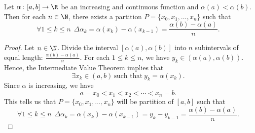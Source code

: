 \begin{lemma}\label{lemma 2}
    Let \( \alpha:[a,b] \to \R  \) be an increasing and continuous function and \( \alpha(a) < \alpha(b) \). Then for each \( n \in \N \), there exists a partition \( P = \{  {x}_{0}, {x}_{1}, \dots, {x}_{n} \}  \) such that   
    \[  \forall 1 \leq k \leq n \ \ \Delta \alpha_k = \alpha({x}_{k}) - \alpha({x}_{k-1}) = \frac{ \alpha(b) - \alpha(a) }{  n  }. \]
\end{lemma}
\begin{proof}
    Let \( n \in \N \). Divide the interval \( [\alpha(a), \alpha(b)] \) into \( n  \) subintervals of equal length: \( \frac{ \alpha(b) - \alpha(a) }{ n  }  \). For each \( 1 \leq k \leq n  \), we have \( {y}_{k } \in (\alpha(a), \alpha(b)) \). Hence, the Intermediate Value Theorem implies that 
    \[  \exists {x}_{k } \in (a,b) \ \text{such that} \ {y}_{k } = \alpha({x}_{k}). \]
    Since \( \alpha  \) is increasing, we have 
    \[  a = {x}_{0} < {x}_{1} < {x}_{2} < \cdots < {x}_{n} = b.   \]
    This tells us that \( P = \{  {x}_{0},{x}_{1}, \dots, {x}_{n} \}  \) will be partition of \( [a,b] \) such that
    \[  \forall 1 \leq k \leq n  \ \ \Delta {\alpha}_{k } = \alpha({x}_{k}) - \alpha({x}_{k-1}) = {y}_{k } - {y}_{k-1} = \frac{ \alpha(b) - \alpha(a) }{ n }. \]
\end{proof}

